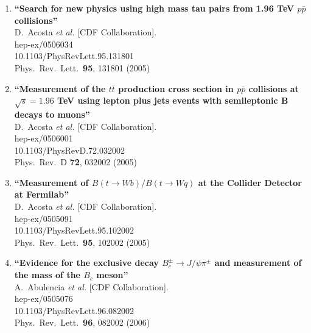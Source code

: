 \documentclass{article}
\begin{document}
\begin{enumerate}
\item%
{\bf ``Search for new physics using high mass tau pairs from 1.96 TeV $p\bar{p}$ collisions''}
  \\{}D.~Acosta {\it et al.}  [CDF Collaboration].
  \\{}hep-ex/0506034
    \\{}10.1103/PhysRevLett.95.131801
\\{}Phys.\ Rev.\ Lett.\  {\bf 95}, 131801 (2005) %


\item%
{\bf ``Measurement of the $t\bar{t}$ production cross section in $p\bar{p}$ collisions at $\sqrt{s} = 1.96$ TeV using lepton plus jets events with semileptonic B decays to muons''}
  \\{}D.~Acosta {\it et al.}  [CDF Collaboration].
  \\{}hep-ex/0506001
    \\{}10.1103/PhysRevD.72.032002
\\{}Phys.\ Rev.\ D {\bf 72}, 032002 (2005) %


\item%
{\bf ``Measurement of $B(t \to W b)/B(t \to W q)$ at the Collider Detector at Fermilab''}
  \\{}D.~Acosta {\it et al.}  [CDF Collaboration].
  \\{}hep-ex/0505091
    \\{}10.1103/PhysRevLett.95.102002
\\{}Phys.\ Rev.\ Lett.\  {\bf 95}, 102002 (2005) %


\item%
{\bf ``Evidence for the exclusive decay $B_c^\pm \to J/\psi \pi^\pm$ and measurement of the mass of the $B_c$ meson''}
  \\{}A.~Abulencia {\it et al.}  [CDF Collaboration].
  \\{}hep-ex/0505076
    \\{}10.1103/PhysRevLett.96.082002
\\{}Phys.\ Rev.\ Lett.\  {\bf 96}, 082002 (2006) %



\end{enumerate}
\end{document}
